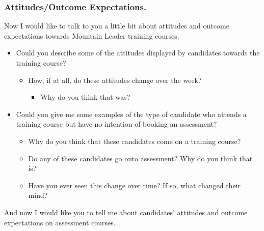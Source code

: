 \documentclass[
  12pt,
  a4paper,
]{book}
\providecommand{\tightlist}{%
  \setlength{\itemsep}{0pt}\setlength{\parskip}{0pt}}
\begin{document}
\hypertarget{attitudesoutcome-expectations.}{%
\subsubsection{Attitudes/Outcome Expectations.}\label{attitudesoutcome-expectations.}}

Now I would like to talk to you a little bit about attitudes and outcome expectations towards Mountain Leader training courses.

\begin{itemize}
\tightlist
\item
  Could you describe some of the attitudes displayed by candidates towards the training course?

  \begin{itemize}
  \tightlist
  \item
    How, if at all, do these attitudes change over the week?

    \begin{itemize}
    \tightlist
    \item
      Why do you think that was?
    \end{itemize}
  \end{itemize}
\item
  Could you give me some examples of the type of candidate who attends a training course but have no intention of booking an assessment?

  \begin{itemize}
  \tightlist
  \item
    Why do you think that these candidates come on a training course?
  \item
    Do any of these candidates go onto assessment? Why do you think that is?
  \item
    Have you ever seen this change over time? If so, what changed their mind?
  \end{itemize}
\end{itemize}

And now I would like you to tell me about candidates' attitudes and outcome expectations on assessment courses.
\end{document}
